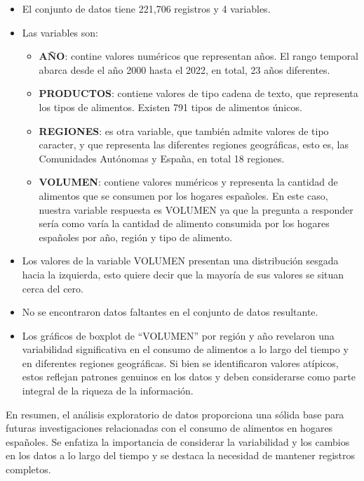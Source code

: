 \documentclass[
]{article}
\begin{document}
\begin{itemize}
\item
  El conjunto de datos tiene 221,706 registros y 4 variables.
\item
  Las variables son:

  \begin{itemize}
  \item
    \textbf{AÑO}: contine valores numéricos que representan años. El
    rango temporal abarca desde el año 2000 hasta el 2022, en total, 23
    años diferentes.
  \item
    \textbf{PRODUCTOS}: contiene valores de tipo cadena de texto, que
    representa los tipos de alimentos. Existen 791 tipos de alimentos
    únicos.
  \item
    \textbf{REGIONES}: es otra variable, que también admite valores de
    tipo caracter, y que representa las diferentes regiones geográficas,
    esto es, las Comunidades Autónomas y España, en total 18 regiones.
  \item
    \textbf{VOLUMEN}: contiene valores numéricos y representa la
    cantidad de alimentos que se consumen por los hogares españoles. En
    este caso, nuestra variable respuesta es VOLUMEN ya que la pregunta
    a responder sería como varía la cantidad de alimento consumida por
    los hogares españoles por año, región y tipo de alimento.
  \end{itemize}
\item
  Los valores de la variable VOLUMEN presentan una distribución sesgada
  hacia la izquierda, esto quiere decir que la mayoría de sus valores se
  situan cerca del cero.
\item
  No se encontraron datos faltantes en el conjunto de datos resultante.
\item
  Los gráficos de boxplot de ``VOLUMEN'' por región y año revelaron una
  variabilidad significativa en el consumo de alimentos a lo largo del
  tiempo y en diferentes regiones geográficas. Si bien se identificaron
  valores atípicos, estos reflejan patrones genuinos en los datos y
  deben considerarse como parte integral de la riqueza de la
  información.
\end{itemize}

En resumen, el análisis exploratorio de datos proporciona una sólida
base para futuras investigaciones relacionadas con el consumo de
alimentos en hogares españoles. Se enfatiza la importancia de considerar
la variabilidad y los cambios en los datos a lo largo del tiempo y se
destaca la necesidad de mantener registros completos.
\end{document}
